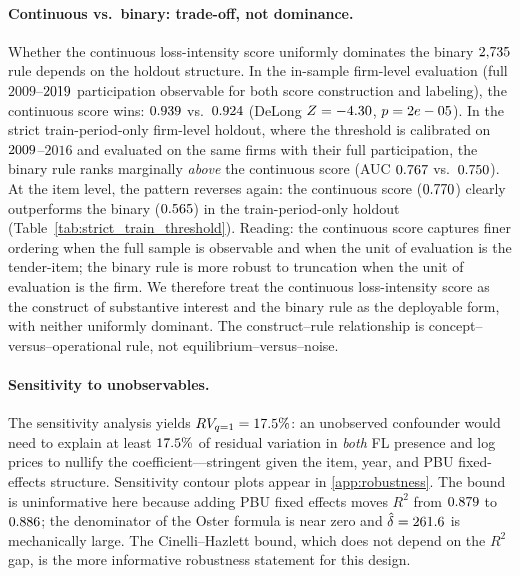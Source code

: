 \paragraph{Continuous vs.\ binary: trade-off, not dominance.}
Whether the continuous loss-intensity score uniformly dominates
the binary $2{,}735$ rule depends on the holdout structure. In
the in-sample firm-level evaluation (full $2009$--$2019$
participation observable for both score construction and
labeling), the continuous score wins:
$0.939$ vs.\ $0.924$
(DeLong $Z=-4.30$, $p=2e-05$). In the strict
train-period-only firm-level holdout, where the threshold is
calibrated on $2009$--$2016$ and evaluated on the
same firms with their full participation, the binary rule
ranks marginally \emph{above} the continuous score
(AUC $0.767$ vs.\ $0.750$). At the
item level, the pattern reverses again: the continuous score
($0.770$) clearly outperforms the binary
($0.565$) in the train-period-only holdout
(Table~\ref{tab:strict_train_threshold}). Reading: the
continuous score captures finer ordering when the full sample
is observable and when the unit of evaluation is the
tender-item; the binary rule is more robust to truncation when
the unit of evaluation is the firm. We therefore treat the
continuous loss-intensity score as the construct of substantive
interest and the binary rule as the deployable form, with
neither uniformly dominant. The construct--rule relationship
is concept--versus--operational rule, not equilibrium--versus--noise.

\paragraph{Sensitivity to unobservables.}
The \citet{cinelli2020making} sensitivity analysis yields
$RV_{q=1} = 17.5\%$: an unobserved confounder would need to
explain at least $17.5\%$ of residual variation in
\emph{both} FL presence and log prices to nullify the
coefficient---stringent given the item, year, and PBU
fixed-effects structure. Sensitivity contour plots appear in
\ref{app:robustness}. The \citet{oster2019unobservable}
bound is uninformative here because adding PBU fixed effects
moves $R^2$ from $0.879$ to $0.886$; the denominator of the
Oster formula is near zero and $\hat{\delta} = 261.6$ is
mechanically large. The Cinelli--Hazlett bound, which does not
depend on the $R^2$ gap, is the more informative robustness
statement for this design.

